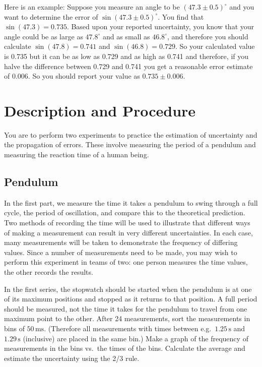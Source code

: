 \documentclass{article}
\begin{document}
Here is an example: Suppose you measure an angle to be $(47.3 \pm 0.5)^\circ$ and you want to determine the error of $\sin(47.3 \pm 0.5)^\circ$. You find that $\sin(47.3) = 0.735$. Based upon your reported uncertainty, you know that your angle could be as large as $47.8^\circ$ and as small as $46.8^\circ$, and therefore you should calculate $\sin(47.8) = 0.741$ and $\sin(46.8) = 0.729$. So your calculated value is 0.735 but it can be as low as 0.729 and as high as 0.741 and therefore, if you halve the difference between 0.729 and 0.741 you get a reasonable error estimate of 0.006. So you should report your value as $0.735 \pm 0.006$.

\section{Description and Procedure}

You are to perform two experiments to practice the estimation of uncertainty and the propagation of errors. These involve measuring the period of a pendulum and measuring the reaction time of a human being.

\subsection{Pendulum}

In the first part, we measure the time it takes a pendulum to swing through a full cycle, the period of oscillation, and compare this to the theoretical prediction. Two methods of recording the time will be used to illustrate that different ways of making a measurement can result in very different uncertainties. In each case, many measurements will be taken to demonstrate the frequency of differing values. Since a number of measurements need to be made, you may wish to perform this experiment in teams of two: one person measures the time values, the other records the results. \myskip

In the first series, the stopwatch should be started when the pendulum is at one of its maximum positions and stopped as it returns to that position. A full period should be measured, not the time it takes for the pendulum to travel from one maximum point to the other. After 24 measurements, sort the measurements in bins of $50\,\mathrm{ms}$. (Therefore all measurements with times between e.g.\ $1.25\,\mathrm{s}$ and $1.29\,\mathrm{s}$ (inclusive) are placed in the same bin.)  Make a graph of the frequency of measurements in the bins vs.\ the times of the bins. Calculate the average and estimate the uncertainty using the 2/3 rule.\myskip
\end{document}
